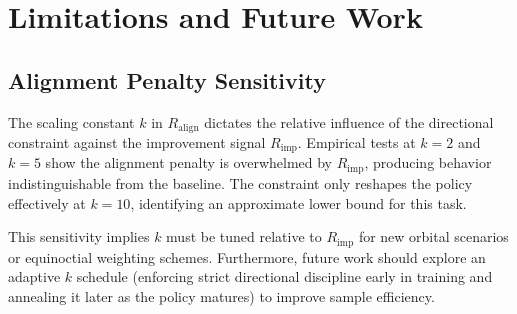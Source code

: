 \documentclass[paper]{ieice}
\begin{document}
\section{Limitations and Future Work}
\label{FutureWorks}

\subsection{Alignment Penalty Sensitivity}
\label{Alignment-Penalty}
The scaling constant $k$ in $R_{\mathrm{align}}$ dictates the relative influence of the directional constraint against the improvement signal $R_{\mathrm{imp}}$. Empirical tests at $k = 2$ and $k = 5$ show the alignment penalty is overwhelmed by $R_{\mathrm{imp}}$, producing behavior indistinguishable from the baseline. The constraint only reshapes the policy effectively at $k = 10$, identifying an approximate lower bound for this task. 

This sensitivity implies $k$ must be tuned relative to $R_{\mathrm{imp}}$ for new orbital scenarios or equinoctial weighting schemes. Furthermore, future work should explore an adaptive $k$ schedule (enforcing strict directional discipline early in training and annealing it later as the policy matures) to improve sample efficiency.


\end{document}
